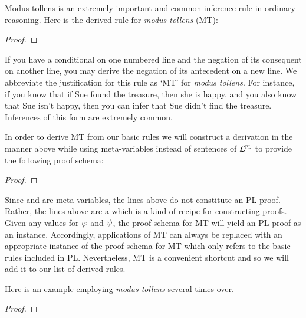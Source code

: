 Modus tollens is an extremely important and common inference rule in ordinary reasoning.
Here is the derived rule for \textit{modus tollens} (MT):

\begin{proof}
	 
\end{proof}

If you have a conditional on one numbered line and the negation of its consequent on another line, you may derive the negation of its antecedent on a new line.
We abbreviate the justification for this rule as `MT' for \emph{modus tollens}.
For instance, if you know that if Sue found the treasure, then she is happy, and you also know that Sue isn't happy, then you can infer that Sue didn't find the treasure.
Inferences of this form are extremely common.

In order to derive MT from our basic rules we will construct a derivation in the manner above while using meta-variables instead of sentences of $\mathcal{L}^{\textsc{pl}}$ to provide the following proof schema:

\begin{proof}
	 \want{\enot \metaB{}}
	\open
		 
	\close
\end{proof}

Since \metaA{} and \metaB{} are meta-variables, the lines above do not constitute an PL proof.
Rather, the lines above are a  which is a kind of recipe for constructing proofs.
Given any values for $\varphi$ and $\psi$, the proof schema for MT will yield an PL proof as an instance.
Accordingly, applications of MT can always be replaced with an appropriate instance of the proof schema for MT which only refers to the basic rules included in PL.
Nevertheless, MT is a convenient shortcut and so we will add it to our list of derived rules.

Here is an example employing \textit{modus tollens} several times over.

\begin{proof}
	 
	 
	 
	 
\end{proof}

